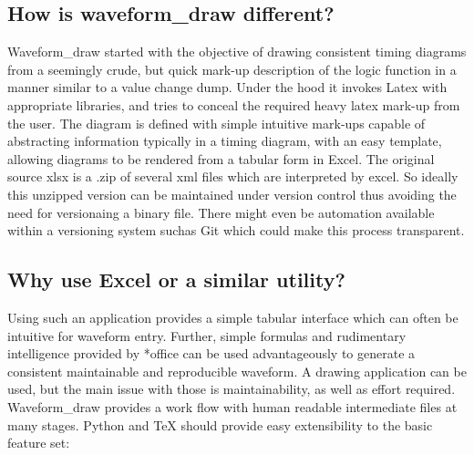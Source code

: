\documentclass[letterpaper,10pt,english]{sphinxmanual}
\begin{document}
\subsection{How is waveform\_draw different?}
\label{\detokenize{intro:how-is-waveform-draw-different}}
Waveform\_draw started with the objective of drawing consistent timing diagrams
from a seemingly crude, but quick mark-up description of the logic function in a
manner similar to a value change dump. Under the hood it invokes Latex with
appropriate libraries, and tries to conceal the required heavy latex mark-up
from the user. The diagram is defined with simple intuitive mark-ups capable
of abstracting information typically in a timing diagram, with an easy
template, allowing diagrams to be rendered from a tabular form in Excel. The
original source xlsx is a .zip of several xml files which are interpreted by
excel. So ideally this unzipped version can be maintained under version control
thus avoiding the need for versionaing a binary file. There might even be
automation available within a versioning system suchas Git which could make this
process transparent.


\subsection{Why use Excel or a similar utility?}
\label{\detokenize{intro:why-use-excel-or-a-similar-utility}}
Using such an application provides a simple tabular interface which can often
be intuitive for waveform entry. Further, simple formulas and rudimentary
intelligence provided by *office can be used advantageously to generate a
consistent maintainable and reproducible waveform. A drawing application can be
used, but the main issue with those is maintainability, as well as effort
required.  Waveform\_draw provides a work flow with human readable intermediate
files at many stages. Python and TeX should provide easy extensibility to the
basic feature set:

%
\begin{sphinxVerbatim}[commandchars=\\\{\}]
      
                 
\end{sphinxVerbatim}
\end{document}
